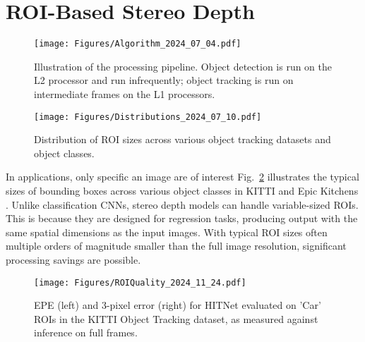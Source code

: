 \section{ROI-Based Stereo Depth}\label{sec:algorithm}

\begin{figure}
    \centering
    \texttt{[image: Figures/Algorithm\_2024\_07\_04.pdf]}
    \caption{Illustration of the \projname{} processing pipeline. Object detection is run on the L2 processor and run infrequently; object tracking is run on intermediate frames on the L1 processors.}
    \label{fig:alg_design}
\end{figure}

\begin{figure}
    \centering
    \texttt{[image: Figures/Distributions\_2024\_07\_10.pdf]}
    \caption{Distribution of ROI sizes across various object tracking datasets and object classes.}
    \label{fig:roi_distribution}
\end{figure}

In  applications, only specific  an image are of interest
Fig.~\ref{fig:roi_distribution} illustrates the typical sizes of bounding boxes across various object classes in %
 KITTI \cite{kitti2012, kitti2015} and Epic Kitchens \cite{epic_kitchens}. %
Unlike classification CNNs, stereo depth models can handle variable-sized ROIs.
This is because they are designed for regression tasks, producing output with the same spatial dimensions as the input images.
With typical ROI sizes often multiple orders of magnitude smaller than the full image resolution, significant processing savings are possible.

\begin{figure}
    \centering
    \texttt{[image: Figures/ROIQuality\_2024\_11\_24.pdf]}
    \caption{EPE (left) and 3-pixel error (right) for HITNet \cite{hitnet} evaluated on 'Car' ROIs in the KITTI Object Tracking \cite{kitti2012} dataset, as measured against inference on full frames.}
    \label{fig:alg_quality}
\end{figure}

